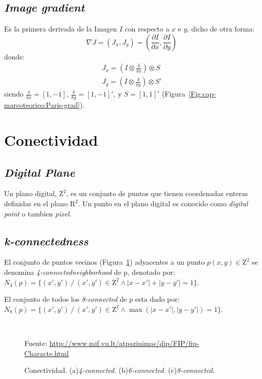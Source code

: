 \subsection{\textit{Image gradient}}
Es la primera derivada de la Imagen $I$ con respecto a $x$ e $y$, dicho de 
otra forma:
\begin{equation}
  \nabla J = (J_x, J_y) = \left( \frac{\partial I}{\partial x}, \frac{\partial I}{\partial y} \right)
\end{equation}
donde:
\begin{eqnarray}
  J_x = \left( I \otimes \frac{\delta}{\delta x} \right) \otimes S \\
  J_y = \left( I \otimes \frac{\delta}{\delta y} \right) \otimes S'
\end{eqnarray}
\noindent siendo $\frac{\delta}{\delta x} = [1, -1]$, $\frac{\delta}{\delta y} = [1, -1]'$, y $S = [1, 1]'$ (Figura~\ref{Fig:cap-marcoteorico:Paris-grad}).

\section{Conectividad}
\label{sec:conectividad}
\subsection{\textit{Digital Plane}}
Un plano digital\cite{Biswas:2010:IsoCovers}, $\mathrm{Z}^2$, es un conjunto 
de puntos que tienen coordenadas enteras definidas en el plano $\mathrm{R}^2$.
Un punto en el plano digital es conocido como \textit{digital point} o tambien
\textit{pixel}.

\subsection{\textit{k-connectedness}}
El conjunto de puntos vecinos (Figura~\ref{Fig:cap-marcoteorico:N-connected}) 
adyacentes a un punto $p(x,y) \in \mathrm{Z}^2$ se denomina 
\textit{4-connectedneighborhood} de p, denotado por: 
$N_4(p) = \lbrace (x', y') ~/~ (x', y') \in \mathrm{Z}^2 \wedge |x - x'| + |y - y'| = 1 \rbrace$. %

El conjunto de todos los \textit{8-connected} de $p$ esta dado por:
$N_8(p) = \lbrace (x', y') ~/~ (x', y') \in \mathrm{Z}^2 \wedge \max ( |x - x'|, |y - y'| ) = 1 \rbrace$.

\begin{figure}[h]
  \centering
   { \, }  
   { }
  \caption[Conectividad]{Conectividad. (a)\textit{4-connected}.
  (b)\textit{6-connected}. (c)\textit{8-connected}.}\tiny{Fuente: 
  \url{http://www.mif.vu.lt/atpazinimas/dip/FIP/fip-Characte.html}}
  \label{Fig:cap-marcoteorico:N-connected}
\end{figure}

